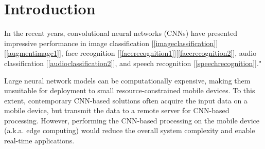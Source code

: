 \documentclass[conference,compsoc]{IEEEtran}
\newcommand{\jani}[1]{\textcolor{red}{\textbf{[Jani: #1]}}}
\newcommand{\prosaic}[1]{#1}
\newcommand{\curtail}[1]{\textcolor{orange}{{#1}}}
\newcommand{\expendable}[1]{\textcolor{blue}{\textit{ Exclusively Expendable (#1)}}}
\begin{document}
%
\IEEEpeerreviewmaketitle


\vspace{-0.75mm}
\section{Introduction}
\vspace{-0.75mm}


In the recent years, convolutional neural networks (CNNs) have presented impressive performance in image classification [\ref{imageclassification}][\ref{augmentimage1}], face recognition [\ref{facerecognition1}][\ref{facerecognition2}], audio classification [\ref{audioclassification2}], and speech recognition [\ref{speechrecognition}]."



Large neural network models can be computationally expensive, making them unsuitable for deployment to small resource-constrained mobile devices. To this extent, contemporary CNN-based solutions often acquire the input data on a mobile device, but transmit the data to a remote server for CNN-based processing. However, performing the CNN-based processing on the mobile device (a.k.a. edge computing) would reduce the overall system complexity and enable real-time applications. %
\end{document}
